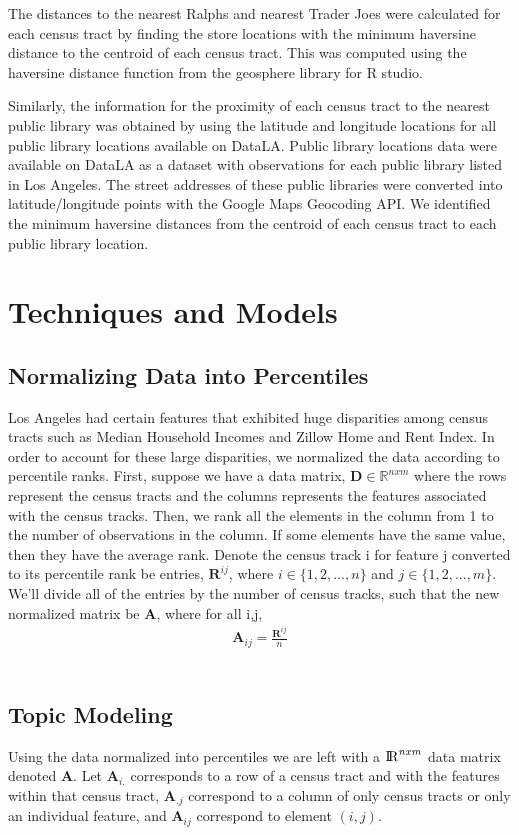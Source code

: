 \documentclass[11pt,letterpaper]{article}
\begin{document}
The distances to the nearest Ralphs and nearest Trader Joes were calculated for each census tract by finding the store locations with the minimum haversine distance to the centroid of each census tract. This was computed using the haversine distance function from the geosphere library for R studio.

Similarly, the information for the proximity of each census tract to the nearest public library was obtained by using the latitude and longitude locations for all public library locations available on DataLA. Public library locations data were available on DataLA as a dataset with observations for each public library listed in Los Angeles. The street addresses of these public libraries were converted into latitude/longitude points with the Google Maps Geocoding API. We identified the minimum haversine distances from the centroid of each census tract to each public library location.

\section{Techniques and Models}

\subsection{Normalizing Data into Percentiles}
Los Angeles had certain features that exhibited huge disparities among census tracts such as Median Household Incomes and Zillow Home and Rent Index. In order to account for these large disparities, we normalized the data according to percentile ranks. First, suppose we have a data matrix, $\textbf{D}	\in\mathbb{R}^{nxm}$ where the rows represent the census tracts and the columns represents the features associated with the census tracks. Then, we rank all the elements in the column from 1 to the number of observations in the column. If some elements have the same value, then they have the average rank. Denote the census track i for feature j converted to its percentile rank be entries, $\textbf{R}^{ij}$, where $i\in\{1,2,...,n\}$ and $j\in\{1,2,...,m\}$. We'll divide all of the entries by the number of census tracks, such that the new normalized matrix be $\textbf{A}$, where for all i,j,
\begin{align}
  \textbf{A}_{ij}  = \frac{\textbf{R}^{ij}}{n}  
\end{align}\\

\subsection{Topic Modeling}
Using the data normalized into percentiles we are left with a ${\rm I\!R}^{nxm}$ data matrix denoted \textbf{A}. Let $\textbf{A}_{i.}$ corresponds to a row of a census tract and with the features within that census tract, $\textbf{A}_{.j}$ correspond to a column of only census tracts or only an individual feature, and $\textbf{A}_{ij}$ correspond to element $(i,j)$.
\end{document}
